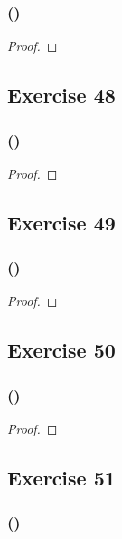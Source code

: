 \documentclass[14pt]{extarticle}
\begin{document}
\subsubsection{()}

\begin{proof}

\end{proof}

\subsection{Exercise 48}

\subsubsection{()}

\begin{proof}

\end{proof}

\subsection{Exercise 49}

\subsubsection{()}

\begin{proof}

\end{proof}

\subsection{Exercise 50}

\subsubsection{()}

\begin{proof}

\end{proof}

\subsection{Exercise 51}

\subsubsection{()}
\end{document}
